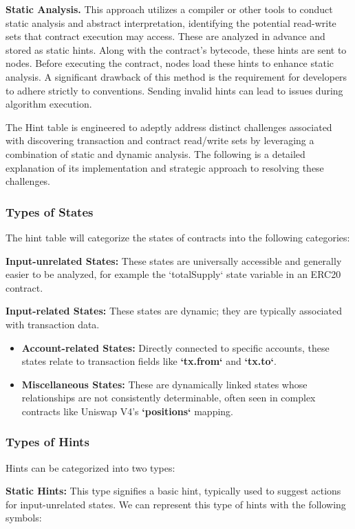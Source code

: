 \textbf{Static Analysis.} This approach utilizes a compiler or other tools to conduct static analysis and abstract interpretation, identifying the potential read-write sets that contract execution may access. These are analyzed in advance and stored as static hints. Along with the contract's bytecode, these hints are sent to nodes. Before executing the contract, nodes load these hints to enhance static analysis. A significant drawback of this method is the requirement for developers to adhere strictly to conventions. Sending invalid hints can lead to issues during algorithm execution.

The Hint table is engineered to adeptly address distinct challenges associated with discovering transaction and contract read/write sets by leveraging a combination of static and dynamic analysis. The following is a detailed explanation of its implementation and strategic approach to resolving these challenges.

\subsubsection{Types of States}

The hint table will categorize the states of contracts into the following categories:

\textbf{Input-unrelated States:} These states are universally accessible and generally easier to be analyzed, for example the `totalSupply` state variable in an ERC20 contract.

\textbf{Input-related States:} These states are dynamic; they are typically associated with transaction data.
\begin{itemize}
\item \textbf{Account-related States:} Directly connected to specific accounts, these states relate to transaction fields like \textbf{`tx.from`} and \textbf{`tx.to`}.
\item \textbf{Miscellaneous States:} These are dynamically linked states whose relationships are not consistently determinable, often seen in complex contracts like Uniswap V4's \textbf{`positions`} mapping.
\end{itemize}
\subsubsection{Types of Hints}

Hints can be categorized into two types:

\textbf{Static Hints:} This type signifies a basic hint, typically used to suggest actions for input-unrelated states. We can represent this type of hints with the following symbols:
    

